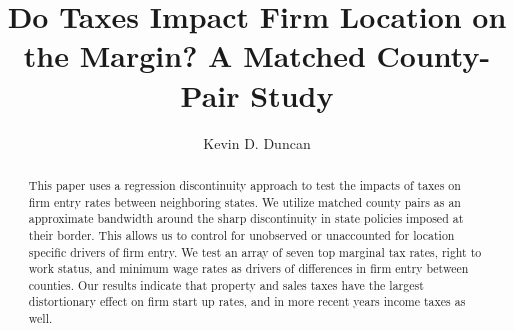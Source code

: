 \documentclass[12pt,a4paper]{article}
\begin{document}
\title{Do Taxes Impact Firm Location on the Margin? A Matched County-Pair Study}
\author{Kevin D. Duncan}
\date{}
\maketitle

\begin{abstract}
This paper uses a regression discontinuity approach to test the impacts of taxes on firm entry rates between neighboring states. We utilize matched county pairs as an approximate bandwidth around the sharp discontinuity in state policies imposed at their border. This allows us to control for unobserved or unaccounted for location specific drivers of firm entry. We test an array of seven top marginal tax rates, right to work status, and minimum wage rates as drivers of differences in firm entry between counties. Our results indicate that property and sales taxes have the largest distortionary effect on firm start up rates, and in more recent years income taxes as well.
\end{abstract}







\end{document}
